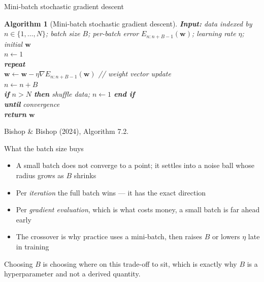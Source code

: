 \documentclass[aspectratio=169, 11pt]{beamer}
\newtheorem{algox}[theorem]{Algorithm}
\newcommand{\srcline}[1]{%
  \par\vspace{0.25em}%
  {\scriptsize\color{mcMuted}\hfill #1\par}}
\newcommand{\src}[3]{}      %
\newcommand{\nosrc}{}       %
\begin{document}
\begin{frame}{Mini-batch stochastic gradient descent}
  \src{bishop2024}{algorithm}{7.2}
  \src{bishop2024}{section}{7.2.4}
  \vspace{0.2em}
  \begin{algox}[Mini-batch stochastic gradient descent]\label{th:msgd}
    \small
    \textbf{Input:} data indexed by $n \in \{1,\dots,N\}$; batch size
    $B$; per-batch error $E_{n:n+B-1}(\mathbf{w})$; learning rate $\eta$;
    initial $\mathbf{w}$\\[0.35em]
    $n \leftarrow 1$\\
    \textbf{repeat}\\
    \hspace{1.4em} $\mathbf{w} \leftarrow \mathbf{w} - \eta \nabla E_{n:n+B-1}(\mathbf{w})$
      \hfill \textcolor{mcMuted}{// weight vector update}\\
    \hspace{1.4em} $n \leftarrow n + B$\\
    \hspace{1.4em} \textbf{if} $n > N$ \textbf{then}
      \; shuffle data; \; $n \leftarrow 1$ \; \textbf{end if}\\
    \textbf{until} convergence\\
    \textbf{return} $\mathbf{w}$
  \end{algox}
  \srcline{Bishop \& Bishop (2024), Algorithm 7.2.}
\end{frame}

\begin{frame}{What the batch size buys}
  \nosrc
  \vspace{0.3em}
  \begin{itemize}\itemsep0.45em
    \item A small batch does not converge to a point; it settles into a
          \alert{noise ball} whose radius grows as $B$ shrinks
    \item Per \emph{iteration} the full batch wins --- it has the exact
          direction
    \item Per \emph{gradient evaluation}, which is what costs money, a
          small batch is far ahead early
    \item The crossover is why practice uses a mini-batch, then raises
          $B$ or lowers $\eta$ late in training
  \end{itemize}
  \begin{redhighlight}
    Choosing $B$ is choosing where on this trade-off to sit, which is
    exactly why $B$ is a hyperparameter and not a derived quantity.
  \end{redhighlight}
\end{frame}
\end{document}
